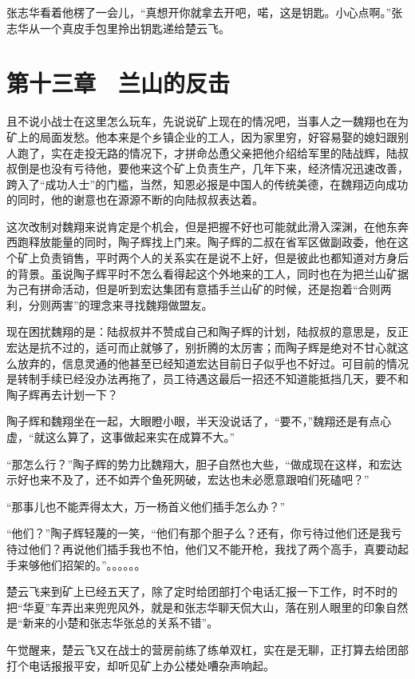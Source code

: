 张志华看着他楞了一会儿，“真想开你就拿去开吧，喏，这是钥匙。小心点啊。”张志华从一个真皮手包里拎出钥匙递给楚云飞。

\section{第十三章　兰山的反击}

且不说小战士在这里怎么玩车，先说说矿上现在的情况吧，当事人之一魏翔也在为矿上的局面发愁。他本来是个乡镇企业的工人，因为家里穷，好容易娶的媳妇跟别人跑了，实在走投无路的情况下，才拼命怂恿父亲把他介绍给军里的陆战辉，陆叔叔倒是也没有亏待他，要他来这个矿上负责生产，几年下来，经济情况迅速改善，跨入了“成功人士”的门槛，当然，知恩必报是中国人的传统美德，在魏翔迈向成功的同时，他的谢意也在源源不断的向陆叔叔表达着。

这次改制对魏翔来说肯定是个机会，但是把握不好也可能就此滑入深渊，在他东奔西跑释放能量的同时，陶子辉找上门来。陶子辉的二叔在省军区做副政委，他在这个矿上负责销售，平时两个人的关系实在是说不上好，但是彼此也都知道对方身后的背景。虽说陶子辉平时不怎么看得起这个外地来的工人，同时也在为把兰山矿据为己有拼命活动，但是听到宏达集团有意插手兰山矿的时候，还是抱着“合则两利，分则两害”的理念来寻找魏翔做盟友。

现在困扰魏翔的是：陆叔叔并不赞成自己和陶子辉的计划，陆叔叔的意思是，反正宏达是抗不过的，适可而止就够了，别折腾的太厉害；而陶子辉是绝对不甘心就这么放弃的，信息灵通的他甚至已经知道宏达目前日子似乎也不好过。可目前的情况是转制手续已经没办法再拖了，员工待遇这最后一招还不知道能抵挡几天，要不和陶子辉再去计划一下？

陶子辉和魏翔坐在一起，大眼瞪小眼，半天没说话了，“要不，”魏翔还是有点心虚，“就这么算了，这事做起来实在成算不大。”

“那怎么行？”陶子辉的势力比魏翔大，胆子自然也大些，“做成现在这样，和宏达示好也来不及了，还不如弄个鱼死网破，宏达也未必愿意跟咱们死磕吧？”

“那事儿也不能弄得太大，万一杨首义他们插手怎么办？”

“他们？”陶子辉轻蔑的一笑，“他们有那个胆子么？还有，你亏待过他们还是我亏待过他们？再说他们插手我也不怕，他们又不能开枪，我找了两个高手，真要动起手来够他们招架的。”。。。。。。

楚云飞来到矿上已经五天了，除了定时给团部打个电话汇报一下工作，时不时的把“华夏”车弄出来兜兜风外，就是和张志华聊天侃大山，落在别人眼里的印象自然是“新来的小楚和张志华张总的关系不错”。

午觉醒来，楚云飞又在战士的营房前练了练单双杠，实在是无聊，正打算去给团部打个电话报报平安，却听见矿上办公楼处嘈杂声响起。

